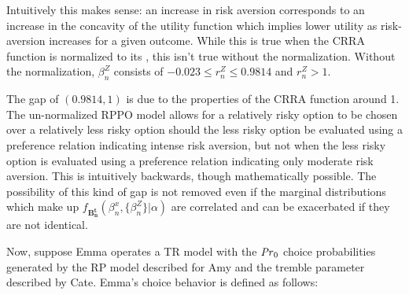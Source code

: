 Intuitively this makes sense: an increase in risk aversion corresponds to an increase in the concavity of the utility function which implies lower utility as risk-aversion increases for a given outcome.
While this is true when the CRRA function is normalized to its {\CE}, this isn't true without the normalization.
Without the normalization, $\beta_n^Z$ consists of $-0.023 \leq r_n^Z \leq 0.9814$ and $r_n^Z > 1$.

The gap of $(0.9814,1)$ is due to the properties of the CRRA function around 1.
The un-normalized RPPO model allows for a relatively risky option to be chosen over a relatively less risky option should the less risky option be evaluated using a preference relation indicating intense risk aversion, but not when the less risky option is evaluated using a preference relation indicating only moderate risk aversion.
This is intuitively backwards, though mathematically possible.
The possibility of this kind of gap is not removed even if the marginal distributions which make up $f_{\mathbf{B^t_n}}(\beta_n^x,\{\beta_n^Z\}|\alpha)$ are correlated and can be exacerbated if they are not identical.

Now, suppose Emma operates a TR model with the ${\mathit{Pr}}_0$ choice probabilities generated by the RP model described for Amy and the tremble parameter described by Cate.
Emma's choice behavior is defined as follows:

